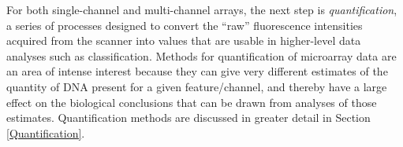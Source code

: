 For both single-channel and multi-channel arrays, the next step is
\emph{quantification}, a series of processes designed to convert the ``raw''
fluorescence intensities acquired from the scanner into values that are usable
in higher-level data analyses such as classification.  Methods for
quantification of microarray data are an area of intense interest
\cite{XXX,XXX,XXX} because they can give very different estimates of the
quantity of DNA present for a given feature/channel, and thereby have a large
effect on the biological conclusions that can be drawn from analyses of those
estimates.  Quantification methods are discussed in greater detail in Section
\ref{Quantification}.

